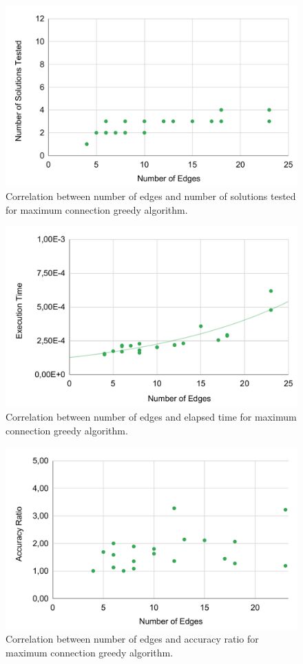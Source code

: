 \begin{figure}[!ht]
    \centering
    \includegraphics[width=0.9\linewidth]{figs/maxc-solutions.pdf}
    \caption{Correlation between number of edges and number of solutions tested for maximum connection greedy algorithm.}
    \label{fig:maxc-sol}
\end{figure}


\begin{figure}[!ht]
    \centering
    \includegraphics[width=0.9\linewidth]{figs/maxc-time.pdf}
    \caption{Correlation between number of edges and elapsed time for maximum connection greedy algorithm.}
    \label{fig:maxc-time}
\end{figure}

\newpage

\begin{figure}[!ht]
    \centering
    \includegraphics[width=0.9\linewidth]{figs/maxc-ratio.pdf}
    \caption{Correlation between number of edges and accuracy ratio for maximum connection greedy algorithm.}
    \label{fig:maxc-ratio}
\end{figure}

